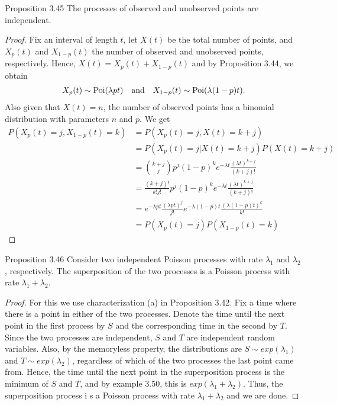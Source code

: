 \begin{boks}{Proposition 3.45}
  The processes of observed and unobserved points are independent.
\end{boks}

\begin{proof}
  Fix an interval of length $t$, let $X(t)$ be the total number of points, and $X_p(t)$ and $X_{1 - p}(t)$ the number of observed and unobserved points, respectively.
  Hence, $X(t) = X_p(t) + X_{1 - p}(t)$ and by Proposition 3.44, we obtain
  \begin{align*}
    X_p(t) \sim \operatorname{Poi}(\lambda pt) \quad \text{and} \quad X_{1 - p}(t) \sim \operatorname{Poi}(\lambda(1 - p)t).
  \end{align*}
  Also given that $X(t) = n$, the number of observed points has a binomial distribution with parameters $n$ and $p$. We get
  \begin{align*}
    P(X_p(t) = j, X_{1-p}(t) = k) &= P(X_p(t) = j, X(t) = k + j)\\
    &= P(X_p(t) = j | X(t) = k + j)P(X(t) = k + j)\\
    &=\binom{k + j}{j} p^j(1 - p)^ke^{-\lambda t} \frac{(\lambda t)^{k + j}}{(k + j)!}\\
    &= \frac{(k + j)!}{k!j!}p^j(1 - p)^ke^{-\lambda t} \frac{(\lambda t)^{k + j}}{(k + j)!}\\
    &= e^{-\lambda pt} \frac{(\lambda pt)^j}{j!}e^{-\lambda(1 - p)t} \frac{(\lambda(1 - p)t)^k}{k!}\\
    &= P(X_p(t) = j)P(X_{1 - p}(t) = k)
  \end{align*}
\end{proof}

\begin{boks}{Proposition 3.46}
  Consider two independent Poisson processes with rate $\lambda_1$ and $\lambda_2$, respectively. The superposition of the two processes is a Poisson process with rate $\lambda_1 + \lambda_2$.
\end{boks}

\begin{proof}
  For this we use characterization (a) in Proposition 3.42.
  Fix a time where there is a point in either of the two processes.
  Denote the time until the next point in the first process by $S$ and the corresponding time in the second by $T$.
  Since the two processes are independent, $S$ and $T$ are independent random variables.
  Also, by the memoryless property, the distributions are $S \sim exp(\lambda_1)$ and $T \sim exp(\lambda_2)$, regardless of which of the two processes the last point came from. Hence, the time until the next point in the superposition process is the minimum of $S$ and $T$, and by example 3.50, this is $exp(\lambda_1 + \lambda_2)$.
  Thus, the superposition process i s a Poisson process with rate $\lambda_1 + \lambda_2$ and we are done.
\end{proof}
